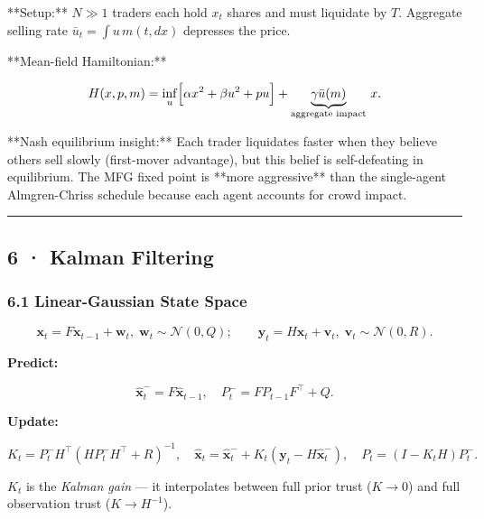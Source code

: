 \documentclass[11pt,a4paper]{article}
\begin{document}
\begin{tcolorbox}[colback=notebg!60,colframe=optgreen,fonttitle=\bfseries\sffamily,title={\textsf{\textbf{Example}} — Example — Optimal Liquidation with Many Agents},breakable]
**Setup:** $N \gg 1$ traders each hold $x_t$ shares and must liquidate by $T$.
Aggregate selling rate $\bar u_t = \int u\,m(t,dx)$ depresses the price.

**Mean-field Hamiltonian:**

$$H(x, p, m) = \inf_u \Bigl[\alpha x^2 + \beta u^2 + pu\Bigr]
+ \underbrace{\gamma \bar u(m)}_{\text{aggregate impact}}\,x.$$

**Nash equilibrium insight:** Each trader liquidates faster when they believe others sell
slowly (first-mover advantage), but this belief is self-defeating in equilibrium.
The MFG fixed point is **more aggressive** than the single-agent Almgren-Chriss schedule
because each agent accounts for crowd impact.
\end{tcolorbox}

\begin{center}\rule{0.5\linewidth}{0.5pt}\end{center}

\subsection{6 · Kalman Filtering}\label{kalman-filtering}

\subsubsection{6.1 Linear-Gaussian State Space}\label{linear-gaussian-state-space}

\[\mathbf{x}_t = F\mathbf{x}_{t-1} + \mathbf{w}_t,\; \mathbf{w}_t\sim\mathcal{N}(0,Q); \qquad
\mathbf{y}_t = H\mathbf{x}_t + \mathbf{v}_t,\; \mathbf{v}_t\sim\mathcal{N}(0,R).\]

\textbf{Predict:}

\[\hat{\mathbf{x}}^-_t = F\hat{\mathbf{x}}_{t-1},\quad P^-_t = FP_{t-1}F^\top+Q.\]

\textbf{Update:}

\[K_t = P^-_t H^\top(HP^-_t H^\top + R)^{-1},\quad
\hat{\mathbf{x}}_t = \hat{\mathbf{x}}^-_t + K_t(\mathbf{y}_t - H\hat{\mathbf{x}}^-_t),\quad
P_t = (I-K_t H)P^-_t.\]

\(K_t\) is the \emph{Kalman gain} --- it interpolates between full prior trust (\(K\to0\)) and full observation trust (\(K\to H^{-1}\)).
\end{document}
